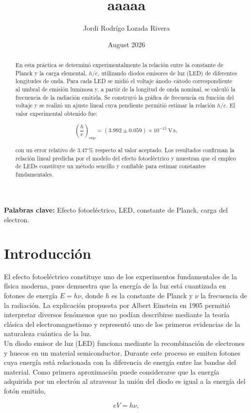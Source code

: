 \documentclass{article}
\title{aaaaa}
\author{Jordi Rodrígo Lozada Rivera}
\date{August 2026}
\begin{document}
\begin{abstract}
En esta práctica se determinó experimentalmente la relación entre la constante de
Planck y la carga elemental, $h/e$, utilizando diodos emisores de luz (LED) de
diferentes longitudes de onda. Para cada LED se midió el voltaje ánodo--cátodo
correspondiente al umbral de emisión luminosa y, a partir de la longitud de onda
nominal, se calculó la frecuencia de la radiación emitida. Se construyó la gráfica
de frecuencia en función del voltaje y se realizó un ajuste lineal cuya pendiente
permitió estimar la relación $h/e$. El valor experimental obtenido fue: 

\[
\left(\frac{h}{e}\right)_{\mathrm{exp}}
=(3.992\pm0.059)\times10^{-15}\ \mathrm{V\,s},
\]

con un error relativo de $3.47\,\%$ respecto al valor aceptado. Los resultados
confirman la relación lineal predicha por el modelo del efecto fotoeléctrico y
muestran que el empleo de LEDs constituye un método sencillo y confiable para
estimar constantes fundamentales.
\end{abstract}


\textbf{Palabras clave:}
Efecto fotoeléctrico, LED, constante de Planck, carga del electron.

\section{Introducción}

El efecto fotoeléctrico constituye uno de los experimentos fundamentales de la
física moderna, pues demuestra que la energía de la luz está cuantizada en
fotones de energía $E=h\nu$, donde $h$ es la constante de Planck y $\nu$ la
frecuencia de la radiación. La explicación propuesta por Albert Einstein en
1905 permitió interpretar diversos fenómenos que no podían describirse mediante
la teoría clásica del electromagnetismo y representó uno de los primeros
evidencias de la naturaleza cuántica de la luz. \\

Un diodo emisor de luz (LED) funciona mediante la recombinación de electrones y
huecos en un material semiconductor. Durante este proceso se emiten fotones cuya
energía está relacionada con la diferencia de energía entre las bandas del
material. Como primera aproximación puede considerarse que la energía adquirida
por un electrón al atravesar la unión del diodo es igual a la energía del fotón
emitido,

\[
eV=h\nu,
\]
\end{document}
